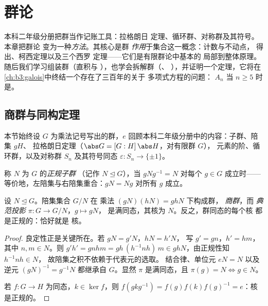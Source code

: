 \chapter{群论}\label{ch:b3:groups}

本科二年级分册把群当作记账工具：拉格朗日
定理、循环群、对称群及其符号。本章把群论
变为一种\emph{方法}。其核心是群
\emph{作用}于集合这一概念：计数与不动点，
得出、柯西定理以及三个西罗
定理——它们是有限群论中基本的
局部到整体原理。随后我们学习组装群（直积与
），也学会拆解群（、
），并证明一个定理，它将在
\cref{ch:b3:galois}中终结一个存在了三百年的关于
多项式方程的问题： $A_n$ 当 $n
\geq 5$ 时是。

\section{商群与同构定理}

本节始终设 $G$ 为乘法记号写出的群，$e$
回顾本科二年级分册中的内容：子群、陪集 $gH$、
拉格朗日定理（$\abs G = [G:H]\,\abs H$，对有限群 $G$），
元素的阶、循环群，以及对称群 $S_n$
及其符号同态 $\varepsilon \colon S_n \to \{\pm1\}$。

\begin{definition}\label{def:b3:groups:normal}
称 $N$ 为 $G$ 的\emph{正规子群}
（记作 $N \trianglelefteq G$），当 $gNg^{-1} = N$ 对每个 $g
\in G$ 成立时——等价地，左陪集与右陪集重合：$gN =
Ng$ 对所有 $g$ 成立。
\end{definition}

\begin{theorem}[商群]\label{thm:b3:groups:quotient}
设 $N \trianglelefteq G$。陪集集合 $G/N$ 在
乘法 $(gN)(hN) = ghN$ 下构成群，
\emph{商群}，而
\emph{典范投影} $\pi \colon G \to G/N$，$g \mapsto gN$，
是满同态，其核为 $N$。反之，群同态的每个核
都是正规的：恰好就是
核。
\end{theorem}

\begin{proof}
良定性正是关键所在。若 $gN = g'N$，$hN = h'N$，
写 $g' = gn$，$h' = hm$，其中 $n, m \in N$。则 $g'h' = gnhm =
gh\,(h^{-1}nh)\,m \in ghN$，由正规性知 $h^{-1}nh \in N$，
故陪集之积不依赖于代表元的选取。
结合律、单位元 $eN = N$ 以及逆元 $(gN)^{-1} = g^{-1}N$
都继承自 $G$。显然 $\pi$ 是满同态，且
$\pi(g) = N \iff g \in N$。

若 $f \colon G \to H$ 为同态，$k \in \ker f$，则
$f(gkg^{-1}) = f(g)f(k)f(g)^{-1} = e$：核是正规的。
\end{proof}

